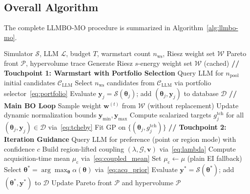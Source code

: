 \documentclass[journal]{IEEEtran}
\newcommand{\btheta}{\boldsymbol{\theta}}
\newcommand{\bw}{\boldsymbol{w}}
\newcommand{\bG}{\mathcal{G}}
\newcommand{\bD}{\mathcal{D}}
\newcommand{\bS}{\mathcal{S}}
\newcommand{\bL}{\mathcal{L}}
\newcommand{\bW}{\mathcal{W}}
\newcommand{\bP}{\mathcal{P}}
\begin{document}
\subsection{Overall Algorithm}

The complete LLMBO-MO procedure is summarized in Algorithm~\ref{alg:llmbo-mo}.

\begin{algorithm}[t]
\caption{LLMBO-MO}
\label{alg:llmbo-mo}
\begin{algorithmic}[1]
\Require Simulator $\bS$, LLM $\bL$, budget $T$, warmstart count $n_{\text{ws}}$, Riesz weight set $\bW$
\Ensure Pareto front $\bP$, hypervolume trace
\State Generate Riesz $s$-energy weight set $\bW$ (cached)
\Statex \textbf{// Touchpoint 1: Warmstart with Portfolio Selection}
\State Query LLM for $n_{\text{pool}}$ initial candidates $\mathcal{C}_{\text{LLM}}$
\State Select $n_{\text{ws}}$ candidates from $\mathcal{C}_{\text{LLM}}$ via portfolio selector~\eqref{eq:portfolio}
    \State Evaluate $\mathbf{y}_j = \bS(\btheta_j)$; add $(\btheta_j, \mathbf{y}_j)$ to database $\bD$
\EndFor
\Statex \textbf{// Main BO Loop}
    \State Sample weight $\bw^{(t)}$ from $\bW$ (without replacement)
    \State Update dynamic normalization bounds $\mathbf{y}_{\min}, \mathbf{y}_{\max}$
    \State Compute scalarized targets $g_j^{\text{tch}}$ for all $(\btheta_j, \mathbf{y}_j) \in \bD$ via~\eqref{eq:tcheby}
    \State Fit GP on $\{(\btheta_j, g_j^{\text{tch}})\}$
    \Statex \hspace{1em} \textbf{// Touchpoint 2: Iteration Guidance}
    \State Query LLM for preference (point or region mode) with confidence $c$
        \State Build region-lifted coupling $(\lambda, \bG, \mathbf{v})$ via~\eqref{eq:lambda}
        \State Compute acquisition-time mean $\mu_{\text{c}}$ via~\eqref{eq:coupled_mean}
    \Else
        \State Set $\mu_{\text{c}} \leftarrow \mu$ (plain EI fallback)
    \EndIf
    \State Select $\btheta^* = \arg\max_{\btheta} \alpha(\btheta)$ via~\eqref{eq:acq_prior}
    \State Evaluate $\mathbf{y}^* = \bS(\btheta^*)$; add $(\btheta^*, \mathbf{y}^*)$ to $\bD$
    \State Update Pareto front $\bP$ and hypervolume
\EndFor
\State \Return $\bP$
\end{algorithmic}
\end{algorithm}


\end{document}
